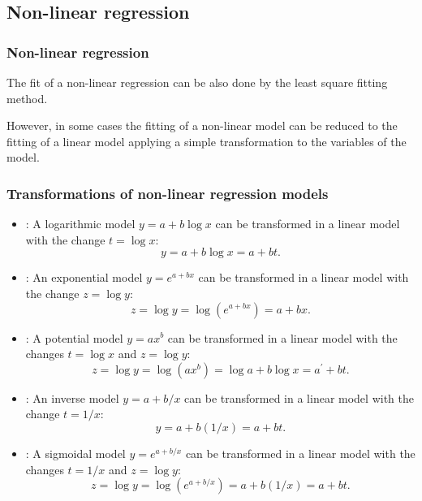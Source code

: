 \subsection{Non-linear regression}
\begin{frame}
\frametitle{Non-linear regression}
The fit of a non-linear regression can be also done by the least square fitting method.

However, in some cases the fitting of a non-linear model can be reduced to the fitting of a linear model applying a simple transformation to the variables of the model. 
\end{frame}


\begin{frame}
\frametitle{Transformations of non-linear regression models}
\begin{itemize}
\item {}: A logarithmic model $y = a+b \log x$ can be transformed in a linear model with
the change $t=\log x$:
\[y=a+b\log x = a+bt.\]
\item {}: An exponential model $y = e^{a+bx}$ can be transformed in a linear model with the
change $z = \log y$:
\[z = \log y = \log(e^{a+bx}) =  a+bx. \]
\item {}: A potential model $y = ax^b$ can be transformed in a linear model with the changes
$t=\log x$ and $z=\log y$:
\[z = \log y = \log(ax^b) = \log a + b \log x = a^\prime+bt.\]
\item {}: An inverse model $y = a+b/x$ can be transformed in a linear model with the change $t=1/x$:
\[y = a + b(1/x) = a+bt.\]
\item {}: A sigmoidal model $y = e^{a+b/x}$ can be transformed in a linear model with the
changes $t=1/x$ and $z=\log y$:
\[z = \log y = \log (e^{a+b/x}) = a+b(1/x) = a+bt.\]
\end{itemize}
\end{frame}


